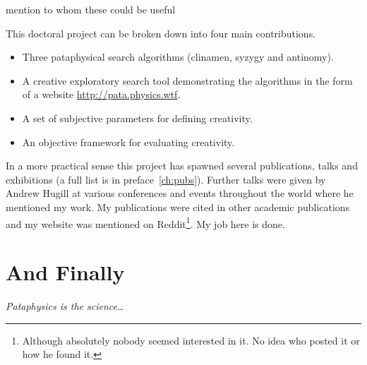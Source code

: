 mention to whom these could be useful


This doctoral project can be broken down into four main contributions.

\begin{itemize}
  \item Three pataphysical search algorithms (clinamen, syzygy and antinomy).
  \item A creative exploratory search tool demonstrating the algorithms in the form of a website \url{http://pata.physics.wtf}.
  \item A set of subjective parameters for defining creativity.
  \item An objective framework for evaluating creativity.
\end{itemize}

In a more practical sense this project has spawned several publications, talks and exhibitions (a full list is in preface~\ref{ch:pubs}). Further talks were given by Andrew Hugill at various conferences and events throughout the world where he mentioned my work. My publications were cited in other academic publications and my website was mentioned on Reddit\footnote{Although absolutely nobody seemed interested in it. No idea who posted it or how he found it.}. My job here is done.


\section{And Finally}

\emph{Pataphysics is the science\ldots}

\stopcontents[chapters]
